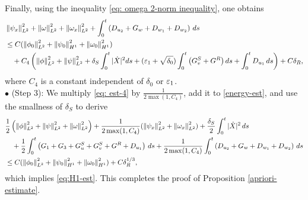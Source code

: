 \documentclass[11pt,reqno]{amsart}
\begin{document}
Finally, using the inequality \eqref{eq: omega 2-norm inequality}, one obtains
\begin{equation} \label{eq: est-4}
\begin{aligned}
	&\left\lVert\psi_x\right\rVert_{L^2}^2+ \left\lVert\omega\right\rVert_{L^2}^2+\left\lVert\omega_x\right\rVert_{L^2}^2 + \int_0^t \left( D_{u_2} + G_w+D_{w_1}+D_{w_2}  \right) \, d s \\
	&\le C (\left\lVert\phi_0\right\rVert_{L^2}^2+\left\lVert\psi_0\right\rVert_{H^1}^2+\left\lVert\omega_0\right\rVert_{H^1}^2)\\
	&\quad + C_4 \left( \left\lVert\phi\right\rVert_{L^2}^2+\left\lVert\psi\right\rVert_{L^2}^2 +  \delta_S \int_0^t | \dot{X}|^2 ds + (\varepsilon_1 + \sqrt{\delta_0} )\int_0^t
\left(  G^S_v+G^R \right) ds +  \int_0^t D_{u_1}\, d s \right)+C \delta_R,
\end{aligned}
\end{equation}
where $C_4$ is a constant independent of $\delta_0$ or $\varepsilon_1$.\\

\noindent $\bullet$ (Step 3): We multiply \eqref{eq: est-4} by $\frac{1}{2 \max (1,C_4)}$, add it to \eqref{energy-est}, and use the smallness of $\delta_S$ to derive
\begin{equation*}
\begin{aligned}
& \frac{1}{2} \left(\left\lVert\phi\right\rVert_{L^2}^2+\left\lVert\psi\right\rVert_{L^2}^2+\left\lVert\omega\right\rVert_{L^2}^2\right) + \frac{1}{2 \max (1,C_4)}(\left\lVert\psi_x\right\rVert_{L^2}^2+\left\lVert\omega_x\right\rVert_{L^2}^2)+ \frac{\delta_S}{2} \int_0^t | \dot{X}|^2 \, d s  \\
&\quad  +\frac{1}{2} \int_0^t \left( G_1+G_3+G^S_u+G^S_v+G^R+D_{u_1} \right) \, ds + \frac{1}{2 \max(1,C_4)} \int_0^t \left(D_{u_2} + G_w+D_{w_1}+D_{w_2}  \right)\, ds \\ 
& \le C( \left\lVert\phi_0\right\rVert_{L^2}^2+\left\lVert\psi_0\right\rVert_{H^1}^2+\left\lVert\omega_0\right\rVert_{H^1}^2 )+C\delta_R^{1/3},
\end{aligned}
\end{equation*}
which implies \eqref{eq:H1-est}. This completes the proof of Proposition \ref{apriori-estimate}.
	
\end{document}
